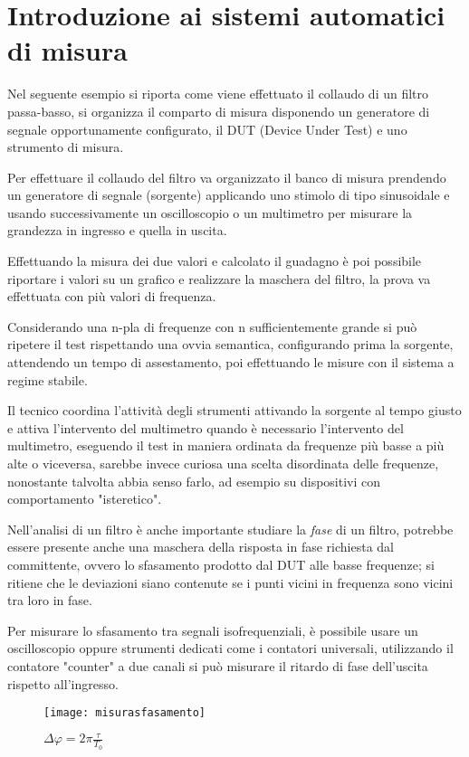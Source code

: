 \chapter{Introduzione ai sistemi automatici di misura}
Nel seguente esempio si riporta come viene effettuato il collaudo di un filtro
passa-basso, si organizza il comparto di misura disponendo un generatore di
segnale opportunamente configurato, il DUT (Device Under Test) e uno strumento
di misura.

Per effettuare il collaudo del filtro va organizzato il banco di misura
prendendo un generatore di
segnale (sorgente)
applicando uno stimolo di tipo sinusoidale e usando successivamente un
oscilloscopio o un multimetro
per misurare la grandezza
in ingresso e quella in uscita.

Effettuando la misura dei due valori e calcolato il guadagno è poi possibile
riportare i valori su
un grafico e realizzare la maschera del filtro, la prova va effettuata con più
valori di frequenza.

Considerando una n-pla di frequenze con n sufficientemente grande si può
ripetere il test
rispettando una ovvia semantica, configurando prima la sorgente, attendendo un
tempo di
assestamento, poi effettuando le misure con il sistema a regime stabile.

Il tecnico coordina l'attività degli strumenti attivando la sorgente al tempo
giusto e attiva
l'intervento del multimetro quando è necessario l'intervento del multimetro,
eseguendo il test in
maniera ordinata da frequenze più basse a più alte o viceversa, sarebbe invece
curiosa una scelta
disordinata delle frequenze, nonostante talvolta abbia senso farlo, ad esempio
su dispositivi con
comportamento "isteretico".

Nell'analisi di un filtro è anche importante studiare la \textit{fase} di un
filtro,
potrebbe essere
presente anche una maschera della risposta in fase richiesta dal committente,
ovvero lo sfasamento
prodotto dal DUT alle basse frequenze; si ritiene che le deviazioni siano
contenute se i punti vicini in
frequenza sono vicini tra loro in fase.

Per misurare lo sfasamento tra segnali isofrequenziali, è possibile usare
un oscilloscopio
oppure strumenti dedicati come i contatori universali, utilizzando il contatore
"counter" a due
canali si può misurare il ritardo di fase dell'uscita rispetto all'ingresso.
\begin{figure}[h]
\centering\texttt{[image: misurasfasamento]}
\caption{$\Delta\varphi = 2\pi \frac{\tau}{T_0}$}
\end{figure}


